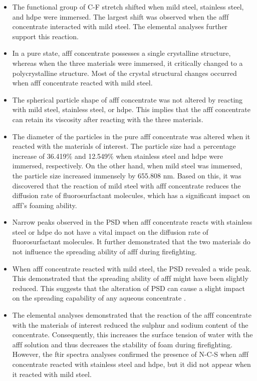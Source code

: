 \begin{itemize}
    \item The functional group of C-F stretch shifted when mild steel, stainless steel, and \acrshort{hdpe} were immersed. The largest shift was observed when the \acrshort{afff} concentrate interacted with mild steel. The elemental analyses further support this reaction.
    \item In a pure state, \acrshort{afff} concentrate possesses a single crystalline structure, whereas when the three materials were immersed, it critically changed to a polycrystalline structure. Most of the crystal structural changes occurred when \acrshort{afff} concentrate reacted with mild steel.
    \item The spherical particle shape of \acrshort{afff} concentrate was not altered by reacting with mild steel, stainless steel, or \acrshort{hdpe}. This implies that the \acrshort{afff} concentrate can retain its viscosity after reacting with the three materials.
    \item The diameter of the particles in the pure \acrshort{afff} concentrate was altered when it reacted with the materials of interest. The particle size had a percentage increase of 36.419\% and 12.549\% when stainless steel and \acrshort{hdpe} were immersed, respectively. On the other hand, when mild steel was immersed, the particle size increased immensely by 655.808 nm. Based on this, it was discovered that the reaction of mild steel with \acrshort{afff} concentrate reduces the diffusion rate of fluorosurfactant molecules, which has a significant impact on \acrshort{afff}'s foaming ability. 
    \item Narrow peaks observed in the PSD when \acrshort{afff} concentrate reacts with stainless steel or \acrshort{hdpe} do not have a vital impact on the diffusion rate of fluorosurfactant molecules. It further demonstrated that the two materials do not influence the spreading ability of \acrshort{afff} during firefighting.
    \item When \acrshort{afff} concentrate reacted with mild steel, the PSD revealed a wide peak. This demonstrated that the spreading ability of \acrshort{afff} might have been slightly reduced. This suggests that the alteration of PSD can cause a slight impact on the spreading capability of any aqueous concentrate \cite{machhi2021effect}.
    \item The elemental analyses demonstrated that the reaction of the \acrshort{afff} concentrate with the materials of interest reduced the sulphur and sodium content of the concentrate. Consequently, this increases the surface tension of water with the \acrshort{afff} solution and thus decreases the stability of foam during firefighting. However, the \acrshort{ftir} spectra analyses confirmed the presence of N-C-S when \acrshort{afff} concentrate reacted with stainless steel and \acrshort{hdpe}, but it did not appear when it reacted with mild steel.

\end{itemize}
